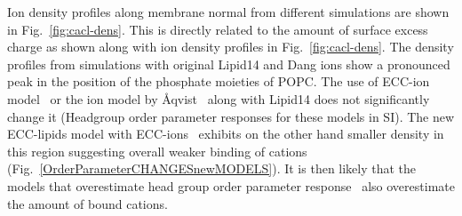 \documentclass[aip,jcp,twocolumn]{revtex4}
\begin{document}

Ion density profiles along membrane normal 
from different simulations are shown in Fig.~\ref{fig:cacl-dens}.
This is directly related to the amount of surface excess charge 
as shown along with ion density profiles in  Fig.~\ref{fig:cacl-dens}.
The density profiles from simulations with original Lipid14 \cite{dickson14}
and Dang ions \cite{smith94,chang1999,dang2006} 
show a pronounced peak in the position of the phosphate moieties of POPC. 
The use of ECC-ion model~\cite{Jungwirth2017,Jungwirth2015,kohagen14,kohagen16}
or the ion model by \AA{qvist}~\cite{aqvist90}
along with Lipid14 does not significantly change it 
(Headgroup order parameter responses for these models in SI).
The new ECC-lipids model with ECC-ions~\cite{Jungwirth2017,Jungwirth2015,kohagen14,kohagen16}
exhibits on the other hand smaller density in this region 
suggesting overall weaker binding of cations (Fig.~\ref{OrderParameterCHANGESnewMODELS}). 
It is then likely that the models that overestimate head group order parameter response~\cite{catte16}
also overestimate the amount of bound cations.
\end{document}
